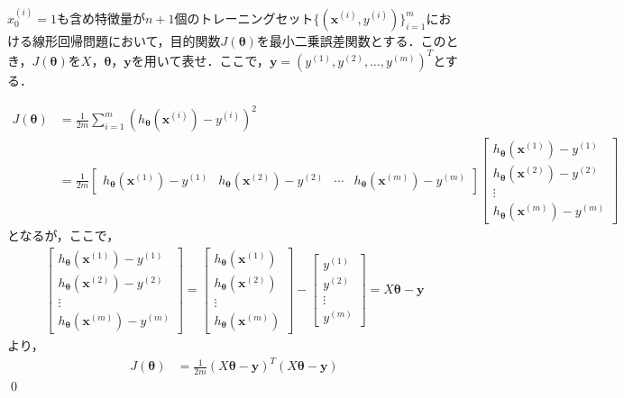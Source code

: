 \begin{qu}
$x_0^{(i)}=1$も含め特徴量が$n+1$個のトレーニングセット$\{({\bm x}^{(i)},y^{(i)})\}_{i=1}^m$における線形回帰問題において，目的関数$J({\bm \theta})$を最小二乗誤差関数とする．このとき，$J({\bm \theta})$を$X$，${\bm \theta}$，${\bm y}$を用いて表せ．ここで，${\bm y}=(y^{(1)},y^{(2)},\ldots,y^{(m)})^T$とする．
\end{qu}
\begin{ans}
\begin{align}
J({\bm \theta})&= \frac{1}{2m}\sum_{i=1}^m (h_{{\bm \theta}}({\bm x}^{(i)})-y^{(i)})^2 \nonumber \\
&=\frac{1}{2m}
\begin{bmatrix}
h_{{\bm \theta}}({\bm x}^{(1)})-y^{(1)} & h_{{\bm \theta}}({\bm x}^{(2)})-y^{(2)} & \cdots & h_{{\bm \theta}}({\bm x}^{(m)})-y^{(m)}
\end{bmatrix}
\begin{bmatrix}
h_{{\bm \theta}}({\bm x}^{(1)})-y^{(1)} \\
h_{{\bm \theta}}({\bm x}^{(2)})-y^{(2)} \\
\vdots \\
h_{{\bm \theta}}({\bm x}^{(m)})-y^{(m)}
\end{bmatrix}\nonumber
\end{align}
となるが，ここで，
\begin{align}
\begin{bmatrix}
h_{{\bm \theta}}({\bm x}^{(1)})-y^{(1)} \\
h_{{\bm \theta}}({\bm x}^{(2)})-y^{(2)} \\
\vdots \\
h_{{\bm \theta}}({\bm x}^{(m)})-y^{(m)}
\end{bmatrix}
=
\begin{bmatrix}
h_{{\bm \theta}}({\bm x}^{(1)}) \\
h_{{\bm \theta}}({\bm x}^{(2)}) \\
\vdots \\
h_{{\bm \theta}}({\bm x}^{(m)})
\end{bmatrix}
-
\begin{bmatrix}
y^{(1)} \\
y^{(2)} \\
\vdots \\
y^{(m)}
\end{bmatrix}
=X{\bm \theta}-{\bm y} \nonumber
\end{align}
より，
\begin{align}
J({\bm \theta})&= \frac{1}{2m}(X{\bm \theta}-{\bm y})^T(X{\bm \theta}-{\bm y})
\end{align}\qed
\end{ans}

